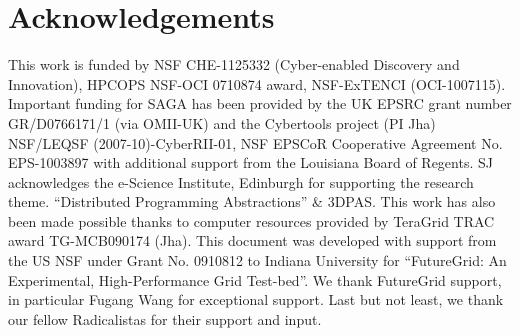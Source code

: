 \documentclass[times]{cpeauth}
\begin{document}
\section*{Acknowledgements}
\footnotesize{This work is funded by NSF CHE-1125332 (Cyber-enabled
  Discovery and Innovation), HPCOPS NSF-OCI 0710874 award, NSF-ExTENCI
  (OCI-1007115).  Important funding for SAGA has been provided by the
  UK EPSRC grant number GR/D0766171/1 (via OMII-UK) and the Cybertools
  project (PI Jha) NSF/LEQSF (2007-10)-CyberRII-01, NSF EPSCoR
  Cooperative Agreement No. EPS-1003897 with additional support from
  the Louisiana Board of Regents.  SJ acknowledges the e-Science
  Institute, Edinburgh for supporting the research
  theme. ``Distributed Programming Abstractions'' \& 3DPAS. 
  This work has also been made possible
  thanks to computer resources provided by TeraGrid TRAC award
  TG-MCB090174 (Jha). This document was developed with support from
  the US NSF under Grant No. 0910812 to Indiana University for
  ``FutureGrid: An Experimental, High-Performance Grid Test-bed''. We
  thank FutureGrid support, in particular Fugang Wang for exceptional
  support. Last but not least, we thank our fellow Radicalistas for
  their support and input.}



\end{document}
